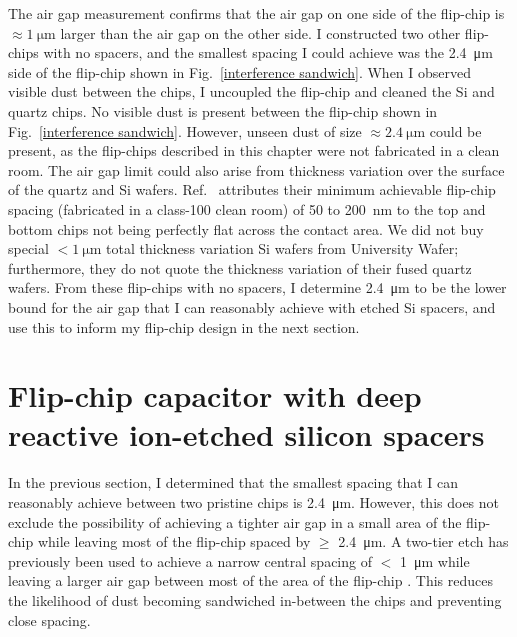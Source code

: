 \documentclass[double,12pt,1in,seploa]{beavtex}
\let\Oldsection\section
\renewcommand{\section}{\FloatBarrier\Oldsection}
\begin{document}
The air gap measurement confirms that the air gap on one side of the flip-chip is $\approx \SI{1}{\micro\meter}$ larger than the air gap on the other side. I constructed two other flip-chips with no spacers, and the smallest spacing I could achieve was the \SI{2.4}{\micro\meter} side of the flip-chip shown in Fig.\ \ref{interference sandwich}. When I observed visible dust between the chips, I uncoupled the flip-chip and cleaned the Si and quartz chips. No visible dust is present between the flip-chip shown in Fig.\ \ref{interference sandwich}. However, unseen dust of size $\approx \SI{2.4}{\micro\meter}$ could be present, as the flip-chips described in this chapter were not fabricated in a clean room. The air gap limit could also arise from thickness variation over the surface of the quartz and Si wafers. Ref.\ \cite{bennaceur_mechanical_2015} attributes their minimum achievable flip-chip spacing (fabricated in a class-100 clean room) of 50 to \SI{200}{\nano\meter} to the top and bottom chips not being perfectly flat across the contact area. We did not buy special $< \SI{1}{\micro\meter}$ total thickness variation Si wafers from University Wafer; furthermore, they do not quote the thickness variation of their fused quartz wafers. From these flip-chips with no spacers, I determine \SI{2.4}{\micro\meter} to be the lower bound for the air gap that I can reasonably achieve with etched Si spacers, and use this to inform my flip-chip design in the next section.


\section{Flip-chip capacitor with deep reactive ion-etched silicon spacers} \label{FC SIspacer}
In the previous section, I determined that the smallest spacing that I can reasonably achieve between two pristine chips is \SI{2.4}{\micro\meter}. However, this does not exclude the possibility of achieving a tighter air gap in a small area of the flip-chip while leaving most of the flip-chip spaced by $\geq$ \SI{2.4}{\micro\meter}. A two-tier etch has previously been used to achieve a narrow central spacing of $<$ \SI{1}{\micro\meter} while leaving a larger air gap between most of the area of the flip-chip \cite{beukman_noninvasive_2015}. This reduces the likelihood of dust becoming sandwiched in-between the chips and preventing close spacing. 
\end{document}
